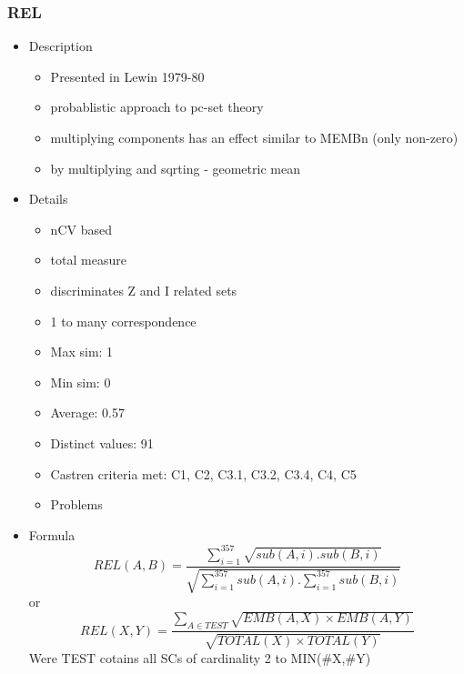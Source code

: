 \documentclass{article}
\begin{document}
\subsubsection{REL}
\label{sec-6-7-1}
\begin{itemize}

\item Description
\label{sec-6-7-1-1}%
\begin{itemize}
\item Presented in Lewin 1979-80
\item probablistic approach to pc-set theory
\item multiplying components has an effect similar to MEMBn (only
  non-zero)
\item by multiplying and sqrting - geometric mean
\end{itemize}

\item Details
\label{sec-6-7-1-2}%
\begin{itemize}
\item nCV based
\item total measure
\item discriminates Z and I related sets
\item 1 to many correspondence
\item Max sim: 1
\item Min sim: 0
\item Average: 0.57
\item Distinct values: 91
\item Castren criteria met: C1, C2, C3.1, C3.2, C3.4, C4, C5
\item Problems
\end{itemize}

\item Formula\\
\label{sec-6-7-1-3}%
$$ REL(A,B)=\frac{\sum_{i=1}^{357}\sqrt{sub(A,i).sub(B,i)}}{\sqrt{\sum_{i=1}^{357}sub(A,i).\sum_{i=1}^{357}sub(B,i)}} $$
or
$$ REL(X,Y)=\frac{ \sum_{A\in TEST}{\sqrt{EMB(A,X) \times EMB(A,Y)}} }{\sqrt{TOTAL(X)\times TOTAL(Y)}}  $$
Were TEST cotains all SCs of cardinality 2 to MIN(\#X,\#Y)
\end{itemize} %
\end{document}
